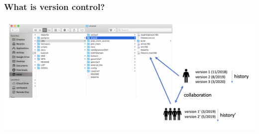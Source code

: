 \documentclass[11pt]{beamer}
\begin{document}

\begin{frame}[fragile]
\frametitle{What is version control?}


 \includegraphics[scale=0.35]{what_is_a_vcs.png}






\end{frame}









\end{document}
